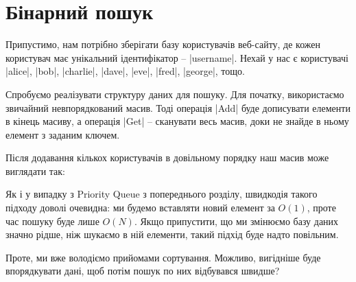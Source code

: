 \documentclass[12pt,a4paper]{report}
\begin{document}
\section {Бінарний пошук}

Припустимо, нам потрібно зберігати базу користувачів веб-сайту, де кожен користувач має унікальний ідентифікатор -- |username|. Нехай у нас є користувачі |alice|, |bob|, |charlie|, |dave|, |eve|, |fred|, |george|, тощо.

Спробуємо реалізувати структуру даних для пошуку. Для початку, використаємо звичайний невпорядкований масив. Тоді операція |Add| буде дописувати елементи в кінець масиву, а операція |Get| -- сканувати весь масив, доки не знайде в ньому елемент з заданим ключем.

Після додавання кількох користувачів в довільному порядку наш масив може виглядати так:

\begin{center}
\end{center}

Як і у випадку з Priority Queue з попереднього розділу, швидкодія такого підходу доволі очевидна: ми будемо вставляти новий елемент за \(O(1)\), проте час пошуку буде лише \(O(N)\). Якщо припустити, що ми змінюємо базу даних значно рідше, ніж шукаємо в ній елементи, такий підхід буде надто повільним.

Проте, ми вже володіємо прийомами сортування. Можливо, вигідніше буде впорядкувати дані, щоб потім пошук по них відбувався швидше?

\begin{center}
\end{center}
\end{document}
